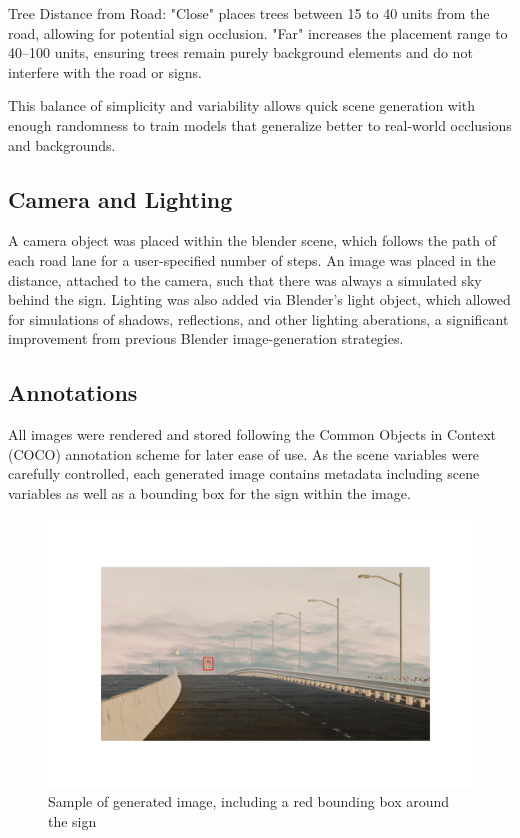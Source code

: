 \documentclass[journal]{IEEEtran}
\begin{document}
Tree Distance from Road:
"Close" places trees between 15 to 40 units from the road, allowing for potential sign occlusion.
"Far" increases the placement range to 40–100 units, ensuring trees remain purely background elements and do not interfere with the road or signs.

This balance of simplicity and variability allows quick scene generation with enough randomness to train models that generalize better to real-world occlusions and backgrounds.

\subsection{Camera and Lighting}
A camera object was placed within the blender scene, which follows the path of each road lane for a user-specified number of steps. An image was placed in the distance, attached to the camera, such that there was always a simulated sky behind the sign. Lighting was also added via Blender's light object, which allowed for simulations of shadows, reflections, and other lighting aberations, a significant improvement from previous Blender image-generation strategies\cite{blender_paper}. 

\subsection{Annotations}
All images were rendered and stored following the Common Objects in Context (COCO) annotation scheme for later ease of use. As the scene variables were carefully controlled, each generated image contains metadata including scene variables as well as a bounding box for the sign within the image. 

\begin{figure}[ht]
    \centering
    \includegraphics[width=\linewidth]{images/sign w box.png}
    \caption{Sample of generated image, including a red bounding box around the sign}
    \label{fig:row_of_images}
\end{figure}
\end{document}
